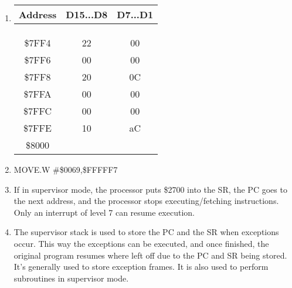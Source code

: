 \documentclass[12pt]{article}
\begin{document}
\begin{enumerate}
	\item
		
			
				\begin{adjustbox}{max width=\linewidth}
					\begin{tabular}{|c|c|c|}
						\multicolumn{1}{c}{Address}		&	\multicolumn{1}{c}{D15...D8}	&	\multicolumn{1}{c}{D7...D1}	\\ \hline
								&		&		\\	\hline
										&		&		\\	\hline
								&		&		\\	\hline
						\$7FF4	&	22	&	00	\\	\hline
						\$7FF6	&	00	&	00	\\	\hline
						\$7FF8	&	20	&	0C	\\	\hline
						\$7FFA	&	00	&	00	\\	\hline
						\$7FFC	&	00	&	00	\\	\hline
						\$7FFE	&	10	&	aC	\\	\hline
						\$8000	&		&		\\	\hline
					\end{tabular}
				\end{adjustbox}
	\item 	MOVE.W	\#\$0069,\$FFFFF7
	
	\item If in supervisor mode, the processor puts \$2700 into the SR, the PC goes to the next address, and the processor stops executing/fetching instructions. Only an interrupt of level 7 can resume execution.
	\item	The supervisor stack is used to store the PC and the SR when exceptions occur. This way the exceptions can be executed, and once finished, the original program resumes where left off due to the PC and SR being stored. It's generally used to store exception frames. It is also used to perform subroutines in supervisor mode.
\end{enumerate}
\end{document}

